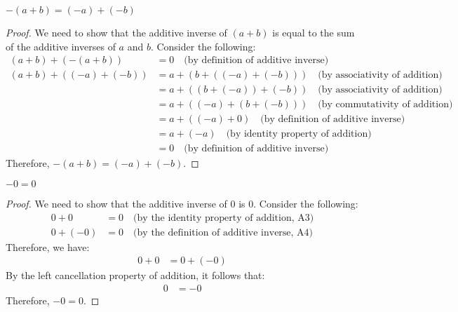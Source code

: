 \documentclass[11pt]{article}
\begin{document}
\begin{proposition}
	$-(a + b) = (-a) + (-b)$
\end{proposition}

\begin{proof}
	We need to show that the additive inverse of $(a + b)$ is equal to the sum of the additive inverses of $a$ and $b$. Consider the following:
	\begin{align*}
		(a + b) + (-(a + b))    & = 0 \quad \text{(by definition of additive inverse)}                  \\
		(a + b) + ((-a) + (-b)) & = a + (b + ((-a) + (-b))) \quad \text{(by associativity of addition)} \\
		                        & = a + ((b + (-a)) + (-b)) \quad \text{(by associativity of addition)} \\
		                        & = a + ((-a) + (b + (-b))) \quad \text{(by commutativity of addition)} \\
		                        & = a + ((-a) + 0) \quad \text{(by definition of additive inverse)}     \\
		                        & = a + (-a) \quad \text{(by identity property of addition)}            \\
		                        & = 0 \quad \text{(by definition of additive inverse)}
	\end{align*}
	Therefore, $-(a + b) = (-a) + (-b)$.
\end{proof}

\begin{proposition}
	$-0 = 0$
\end{proposition}

\begin{proof}
	We need to show that the additive inverse of $0$ is $0$. Consider the following:
	\begin{align*}
		0 + 0    & = 0 \quad \text{(by the identity property of addition, A3)}  \\
		0 + (-0) & = 0 \quad \text{(by the definition of additive inverse, A4)}
	\end{align*}
	Therefore, we have:
	\begin{align*}
		0 + 0 & = 0 + (-0)
	\end{align*}
	By the left cancellation property of addition, it follows that:
	\begin{align*}
		0 & = -0
	\end{align*}
	Therefore, $-0 = 0$.
\end{proof}
\end{document}
